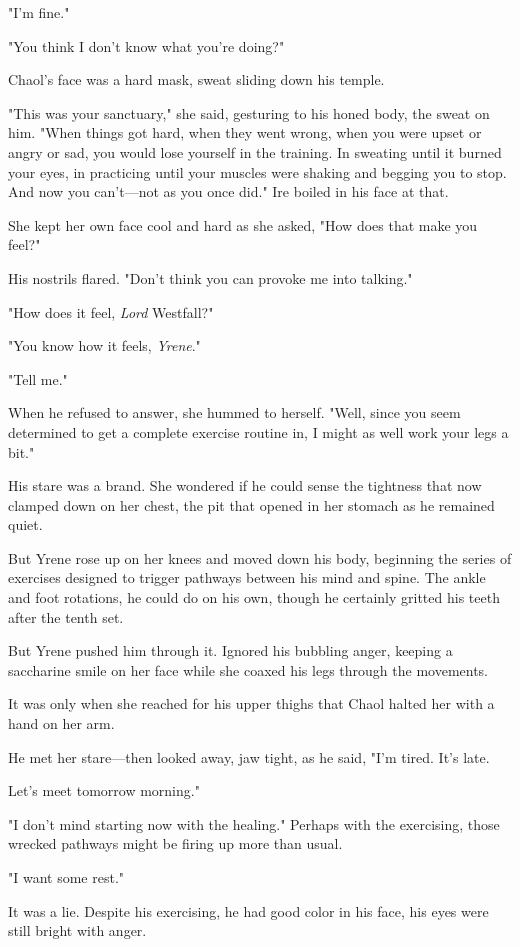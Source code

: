 "I'm fine."

"You think I don't know what you're doing?"

Chaol's face was a hard mask, sweat sliding down his temple.

"This was your sanctuary," she said, gesturing to his honed body, the sweat on him. "When things got hard, when they went wrong, when you were upset or angry or sad, you would lose yourself in the training. In sweating until it burned your eyes, in practicing until your muscles were shaking and begging you to stop. And now you can't---not as you once did." Ire boiled in his face at that.

She kept her own face cool and hard as she asked, "How does that make you feel?"

His nostrils flared. "Don't think you can provoke me into talking."

"How does it feel, \emph{Lord} Westfall?"

"You know how it feels, \emph{Yrene}."

"Tell me."

When he refused to answer, she hummed to herself. "Well, since you seem determined to get a complete exercise routine in, I might as well work your legs a bit."

His stare was a brand. She wondered if he could sense the tightness that now clamped down on her chest, the pit that opened in her stomach as he remained quiet.

But Yrene rose up on her knees and moved down his body, beginning the series of exercises designed to trigger pathways between his mind and spine. The ankle and foot rotations, he could do on his own, though he certainly gritted his teeth after the tenth set.

But Yrene pushed him through it. Ignored his bubbling anger, keeping a saccharine smile on her face while she coaxed his legs through the movements.

It was only when she reached for his upper thighs that Chaol halted her with a hand on her arm.

He met her stare---then looked away, jaw tight, as he said, "I'm tired. It's late.

Let's meet tomorrow morning."

"I don't mind starting now with the healing." Perhaps with the exercising, those wrecked pathways might be firing up more than usual.

"I want some rest."

It was a lie. Despite his exercising, he had good color in his face, his eyes were still bright with anger.

